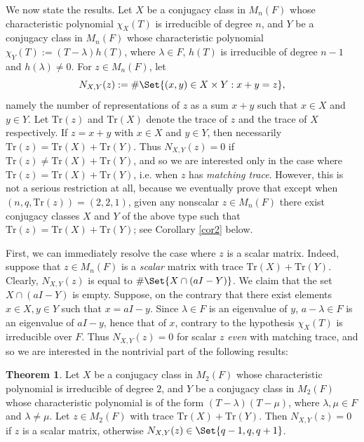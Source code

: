 \documentclass[preprint,11pt]{amsart}
\theoremstyle{definition}
\newtheorem{thm}{Theorem}
\numberwithin{thm}{section}
\newcommand{\tit}[1]{\textit{#1}}
\newcommand{\lam}{\lambda}
\newcommand{\tr}{\textrm{Tr}}
\begin{document}
We now state the results.  Let $X$ be a conjugacy class in $M_n(F)$ whose characteristic polynomial $\chi_X(T)$ is irreducible of degree $n$, and $Y$ be a conjugacy class in $M_n(F)$ whose characteristic polynomial $\chi_Y(T) := (T- \lambda) h(T)$, where $\lambda \in F$, $h(T)$ is irreducible of degree $n-1$ and $h(\lambda) \neq 0$. For $z \in M_n(F)$, let
$$
N_{X, Y} (z) := \# \Set{(x,y) \in X \times Y : x + y = z},
$$
namely the number of representations of $z$ as a sum $x + y$ such that $x \in X$ and $y \in Y$. Let $\tr(z)$ and $\tr(X)$ denote the trace of $z$ and the trace of $X$ respectively. If $z = x + y$ with $x \in X$ and $y \in Y$, then necessarily $\tr(z)  = \tr(X) + \tr(Y)$. Thus $N_{X, Y}(z) = 0$ if $\tr(z) \neq \tr(X) + \tr(Y)$, and so we are interested only in the case where $\tr(z) = \tr(X) + \tr(Y)$, i.e. when $z$ has \textit{matching trace}. However, this is not a serious restriction at all, because we eventually prove that except when $(n,q,\tr(z)) = (2,2,1)$,  given any nonscalar $z \in M_n(F)$ there exist conjugacy classes $X$ and $Y$ of the above type such that $\tr(z) = \tr(X) + \tr(Y)$; see Corollary \ref{cor2} below.

First, we can immediately resolve the case where $z$ is a scalar matrix. Indeed, suppose that $z \in M_n(F)$ is a \textit{scalar} matrix with trace $\tr(X) + \tr(Y)$. Clearly, $N_{X, Y}(z)$ is equal to  $\# \Set{ X \cap (aI-Y) }$. We claim that the set $X \cap (aI - Y)$ is empty. Suppose, on the contrary that there exist elements $x \in X, y \in Y$ such that  $x = aI -y$. Since $\lam \in F$ is an eigenvalue of $y$, $a- \lam \in F$ is an eigenvalue of $aI - y$, hence that of $x$, contrary to the hypothesis $\chi_X(T)$ is irreducible over $F$.  Thus $N_{X, Y}(z) = 0$ for scalar $z$ \tit{even} with matching trace,  and so we are interested in the nontrivial part of the following results:

\begin{thm}\label{main_theorem_n=2}
Let $X$ be a conjugacy class in $M_2(F)$ whose characteristic polynomial is irreducible of degree $2$, and $Y$ be a conjugacy class in $M_2(F)$ whose characteristic polynomial is of the form $(T - \lambda)(T- \mu)$, where $\lambda, \mu \in F$ and $\lambda \neq \mu$. Let $z \in M_2(F)$ with trace $\textrm{Tr}(X) + \textrm{Tr}(Y)$. Then $N_{X, Y}(z) = 0$ if $z$ is a scalar matrix, otherwise $N_{X, Y}(z) \in \Set{q-1,q,q+1}$. 
\end{thm}
\end{document}
